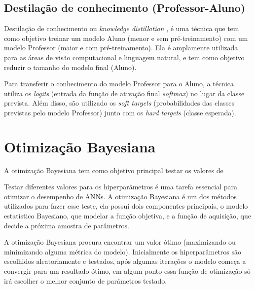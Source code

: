 \subsection{Destilação de conhecimento (Professor-Aluno)}\label{conceitos_destilacao}

Destilação de conhecimento ou \textit{knowledge distillation} \cite{hinton2015distilling}, é uma técnica que tem
como objetivo treinar um modelo Aluno (menor e sem pré-treinamento) com um modelo Professor
(maior e com pré-treinamento). Ela é amplamente utilizada para as áreas de visão computacional e linguagem natural,
e tem como objetivo reduzir o tamanho do modelo final (Aluno).

Para transferir o conhecimento do modelo Professor para o Aluno, a técnica utiliza os \textit{logits} (entrada da
função de ativação final \textit{softmax}) no lugar da classe prevista. Além disso, são utilizado os
\textit{soft targets} (probabilidades das classes previstas pelo modelo Professor) junto com os
\textit{hard targets} (classe esperada).


\section{Otimização Bayesiana}\label{cap_conceitos_bayesiana}
A otimização Bayesiana tem como objetivo principal testar os valores de

Testar diferentes valores para os hiperparâmetros é uma tarefa essencial para otimizar o desempenho de ANNs.
A otimização Bayesiana é um dos métodos utilizados para fazer esse teste, ela possui dois componentes principais,
o modelo estatístico Bayesiano, que modelar a função objetiva, e a função de aquisição, que decide a próxima amostra
de parâmetros. \cite{frazier2018tutorial}

A otimização Bayesiana procura encontrar um valor ótimo (maximizando ou minimizando alguma métrica do modelo).
Inicialmente os hiperparâmetros são escolhidos aleatoriamente e testados, após algumas iterações o modelo começa
a convergir para um resultado ótimo, em algum ponto essa função de otimização só irá escolher o melhor conjunto de
parâmetros testado.

